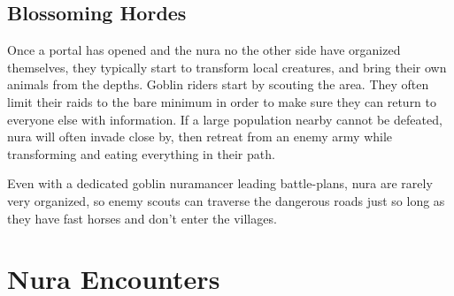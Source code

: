 \begin{multicols}{2}
\subsection{Blossoming Hordes}
Once a portal has opened and the nura no the other side have organized themselves, they typically start to transform local creatures, and bring their own animals from the depths.
Goblin riders start by scouting the area.
They often limit their raids to the bare minimum in order to make sure they can return to everyone else with information.
If a large population nearby cannot be defeated, nura will often invade close by, then retreat from an enemy army while transforming and eating everything in their path.

Even with a dedicated goblin nuramancer leading battle-plans, nura are rarely very organized, so enemy scouts can traverse the dangerous roads just so long as they have fast horses and don't enter the villages.

\end{multicols}

\section{Nura Encounters}

